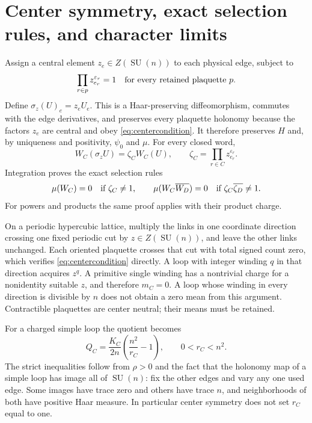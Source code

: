 \documentclass[11pt]{article}
\theoremstyle{definition}
\newcommand{\SU}{\operatorname{SU}}
\begin{document}
\section{Center symmetry, exact selection rules, and character limits}

Assign a central element $z_e\in Z(\SU(n))$ to each physical edge, subject
to
\begin{equation}\label{eq:centercondition}
 \prod_{r\in p}z_{e_r}^{\varepsilon_r}=1
 \quad\hbox{for every retained plaquette }p.
\end{equation}
Define $\sigma_z(U)_e=z_eU_e$. This is a Haar-preserving diffeomorphism,
commutes with the edge derivatives, and preserves every plaquette
holonomy because the factors $z_e$ are central and obey
\eqref{eq:centercondition}. It therefore preserves $H$ and, by uniqueness
and positivity, $\psi_0$ and $\mu$. For every closed word,
\[
 W_C(\sigma_z U)=\zeta_C W_C(U),\qquad
 \zeta_C=\prod_{r\in C}z_{e_r}^{\varepsilon_r}.
\]
Integration proves the exact selection rules
\begin{equation}\label{eq:selection}
 \mu(W_C)=0\quad\hbox{if }\zeta_C\ne1,
 \qquad
 \mu(W_C\overline{W_D})=0\quad\hbox{if }\zeta_C\overline{\zeta_D}\ne1.
\end{equation}
For powers and products the same proof applies with their product charge.

On a periodic hypercubic lattice, multiply the links in one coordinate
direction crossing one fixed periodic cut by $z\in Z(\SU(n))$, and
leave the other links unchanged. Each oriented plaquette crosses that
cut with total signed count zero, which verifies
\eqref{eq:centercondition} directly. A loop with integer winding $q$
in that direction acquires $z^q$. A primitive single winding has a
nontrivial charge for a nonidentity suitable $z$, and therefore $m_C=0$.
A loop whose winding in every direction is divisible by $n$ does not
obtain a zero mean from this argument. Contractible plaquettes are
center neutral; their means must be retained.

For a charged simple loop the quotient becomes
\begin{equation}\label{eq:chargedquotient}
 Q_C=\frac{K_C}{2n}\left(\frac{n^2}{r_C}-1\right),
 \qquad 0<r_C<n^2.
\end{equation}
The strict inequalities follow from $\rho>0$ and the fact that the
holonomy map of a simple loop has image all of $\SU(n)$: fix the other
edges and vary any one used edge. Some images have trace zero and
others have trace $n$, and neighborhoods of both have positive Haar
measure. In particular center symmetry does not set $r_C$ equal to one.
\end{document}
